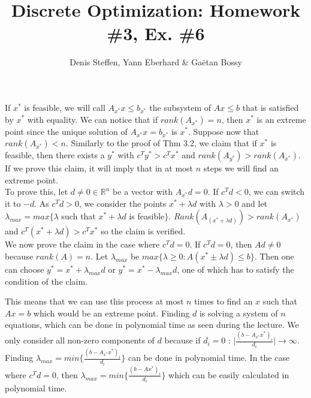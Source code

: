 \documentclass[a4paper,11pt,french]{article}
\title{Discrete Optimization: Homework \#3, Ex. \#6}
\author{Denis Steffen, Yann Eberhard \& Gaëtan Bossy}
\begin{document}
\maketitle
If $x^*$ is feasible, we will call $A_{x^*}x\leq b_{x^*}$ the subsystem of $Ax\leq b$ that is satisfied by $x^*$ with equality. 
We can notice that if $rank(A_{x^*}) = n$, then $x^*$ is an extreme point since the unique solution of $A_{x^*}x = b_{x^*}$ is $x^*$.
Suppose now that $rank(A_{x^*}) < n$. Similarly to the proof of Thm 3.2, we claim that if $x^*$ is feasible, then there exists a $y^*$ with $c^T y^* > c^T x^*$ and $rank(A_{y^*}) > rank(A_{x^*})$. If we prove this claim, it will imply that in at most $n$ steps we will find an extreme point.\\
To prove this, let $d \not= 0 \in \mathbb{R}^n$ be a vector with $A_{x^*}d = 0$. If $c^T d < 0$, we can switch it to $-d$. As $c^T d > 0$, we consider the points $x^* + \lambda d$ with $\lambda> 0$ and let $\lambda_{max}=max\{\lambda$ such that $x^* + \lambda d$ is feasible$\}$. 
$Rank(A_{(x^*+\lambda d)})>rank(A_{x^*})$ and $c^T(x^*+\lambda d)>c^Tx^*$ so the claim is verified. \\
We now prove the claim in the case where $c^T d = 0$. If $c^Td=0$, then $Ad \not= 0$ because $rank(A) = n$. 
Let $\lambda_{max}$ be $max\{\lambda \geq 0: A(x^*\pm\lambda d) \leq b\}$. Then one can choose $y^* = x^* + \lambda_{max}d$ or
$y^* = x^* - \lambda_{max}d$, one of which has to satisfy the condition of the claim. 

This means that we can use this process at most $n$ times to find an $x$ such that $Ax=b$ which would be an extreme point.
Finding $d$ is solving a system of $n$ equations, which can be done in polynomial time as seen during the lecture. 
We only consider all non-zero components of $d$ because if $d_i = 0$ : $\mid\frac{(b-A_{x^*}x^*)_i}{d_i}\mid \longrightarrow \infty$.
Finding $\lambda_{max} = min\{\frac{(b-A_{x^*}x^*)_i}{d_i}\}$ can be done in polynomial time. In the case where $c^Td=0$, then $\lambda_{max}=min\{\frac{(b-Ax^*)_i}{d_i}\}$ which can be easily calculated in polynomial time.
\end{document}
